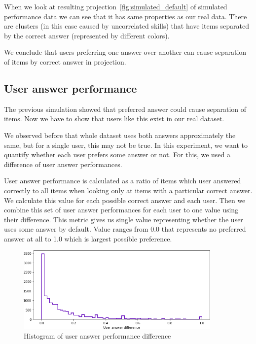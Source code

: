 \documentclass[
  printed, %
  table,   %
  nolof,     %
  nolot,     %
  color,
  final,
  nocover
]{fithesis3}
\begin{document}
When we look at resulting projection~\ref{fig:simulated_default} of simulated performance data we can see that it has same properties as our real data. There are clusters (in this case caused by uncorrelated skills) that have items separated by the correct answer (represented by different colors).

We conclude that users preferring one answer over another can cause separation of items by correct answer in projection.


\subsection{User answer performance}\label{user-answer-performance}


The previous simulation showed that preferred answer could cause separation of items. Now we have to show that users like this exist in our real dataset.

We observed before that whole dataset uses both answers approximately the same, but for a single user, this may not be true. In this experiment, we want to quantify whether each user prefers some answer or not. For this, we used a difference of user answer performances.

User answer performance is calculated as a ratio of items which user answered correctly to all items when looking only at items with a particular correct answer. We calculate this value for each possible correct answer and each user. Then we combine this set of user answer performances for each user to one value using their difference. This metric gives us single value representing whether the user uses some answer by default. Value ranges from 0.0 that represents no preferred answer at all to 1.0 which is largest possible preference.

\begin{figure}
  \includegraphics[width=10cm]{img/uneven_answers_hist}
  \caption{Histogram of user answer performance difference}
  \label{fig:uneven_answers_hist}
\end{figure}
\end{document}
